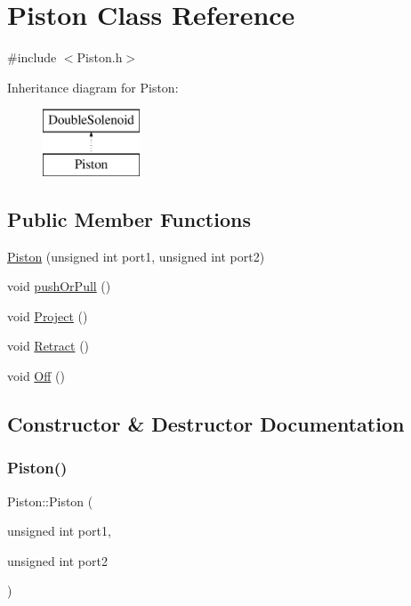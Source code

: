 \hypertarget{classPiston}{}\section{Piston Class Reference}
\label{classPiston}


{\ttfamily \#include $<$Piston.\+h$>$}

Inheritance diagram for Piston\+:\begin{figure}[H]
\begin{center}
\leavevmode
\includegraphics[height=2.000000cm]{classPiston}
\end{center}
\end{figure}
\subsection*{Public Member Functions}
\begin{DoxyCompactItemize}
\item 
\hyperlink{classPiston_abaa2dd7ebb6a1066418652aebfd62491}{Piston} (unsigned int port1, unsigned int port2)
\item 
void \hyperlink{classPiston_ad41333bdc156996df7552b766073be3d}{push\+Or\+Pull} ()
\item 
void \hyperlink{classPiston_ad02eef5cfb0ed9f92ee4605dadb46440}{Project} ()
\item 
void \hyperlink{classPiston_a37038045cb847723f935f625f4ff6d84}{Retract} ()
\item 
void \hyperlink{classPiston_a44a19e212f16a4793b125d2725c470ce}{Off} ()
\end{DoxyCompactItemize}


\subsection{Constructor \& Destructor Documentation}
\mbox{\label{classPiston_abaa2dd7ebb6a1066418652aebfd62491}} 
\subsubsection{\texorpdfstring{Piston()}{Piston()}}
{\footnotesize\ttfamily Piston\+::\+Piston (\begin{DoxyParamCaption}\item[{unsigned int}]{port1,  }\item[{unsigned int}]{port2 }\end{DoxyParamCaption})\hspace{0.3cm}{\ttfamily [inline]}}



